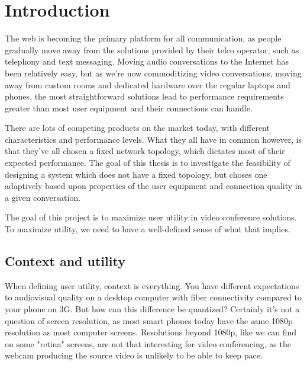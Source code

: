 \chapter{Introduction}\label{chp:introduction}

The web is becoming the primary platform for all communication, as people gradually move away from the solutions provided by their telco operator, such as telephony and text messaging. Moving audio conversations to the Internet has been relatively easy, but as we're now commoditizing video conversations, moving away from custom rooms and dedicated hardware over the regular laptops and phones, the most straightforward solutions lead to performance requirements greater than most user equipment and their connections can handle.

There are lots of competing products on the market today, with different characteristics and performance levels. What they all have in common however, is that they've all chosen a fixed network topology, which dictates most of their expected performance. The goal of this thesis is to investigate the feasibility of designing a system which does not have a fixed topology, but choses one adaptively based upon properties of the user equipment and connection quality in a given conversation.


The goal of this project is to maximize user utility in video conference solutions. To maximize utility, we need to have a well-defined sense of what that implies.


\section{Context and utility}

When defining user utility, context is everything. You have different expectations to audiovisual quality on a desktop computer with fiber connectivity compared to your phone on 3G. But how can this difference be quantized? Certainly it's not a question of screen resolution, as most smart phones today have the same 1080p resolution as most computer screens. Resolutions beyond 1080p, like we can find on some "retina" screens, are not that interesting for video conferencing, as the webcam producing the source video is unlikely to be able to keep pace.

